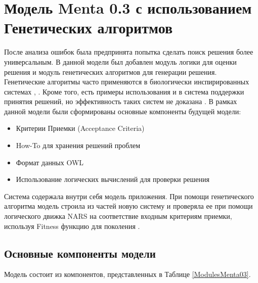 \section{Модель Menta 0.3 с использованием Генетических алгоритмов} \label{chapt2}
После анализа ошибок была предпринята попытка сделать поиск решения более универсальным. В данной модели был добавлен модуль логики для оценки решения и модуль генетических алгоритмов для генерации решения. Генетические алгоритмы часто применяются в биологически инспирированных системах \cite{G1}, \cite{G3}. Кроме того, есть примеры использования и в система поддержки принятия решений, но эффективность таких систем не доказана \cite{G2}. В рамках данной модели были сформированы основные компоненты будущей модели:
\begin{itemize}
	\item Критерии Приемки (Acceptance Criteria)
	\item How-To для хранения решений проблем
	\item Формат данных OWL 
	\item Использование логических вычислений для проверки решения
\end{itemize} \par
Система содержала внутри себя модель приложения. При помощи генетического алгоритма модель строила из частей новую систему и проверяла ее при помощи логического движка NARS\cite{NARS} на соответствие входным критериям приемки, используя Fitness функцию для поколения \cite{GFITNESS}. 
\clearpage
\subsection{Основные компоненты модели}
Модель состоит из компонентов, представленных в Таблице \ref{ModulesMenta03}.

